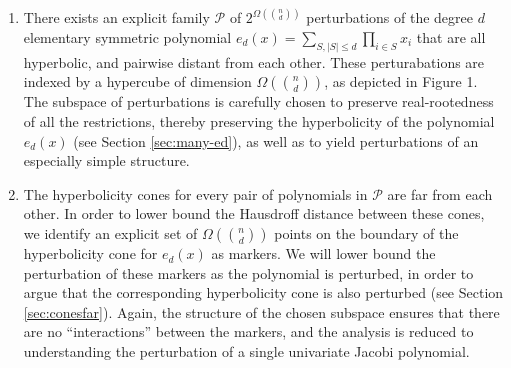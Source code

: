 \begin{enumerate}
\item There exists an explicit family $\mathcal{P}$ of $2^{\Omega(\binom{n}{d}
	)}$ perturbations of the degree $d$ elementary symmetric polynomial $e_d(x) = \sum_{S, |S| \leq d} \prod_{i \in S} x_i$ that are all hyperbolic, and pairwise distant from each other. These perturabations are indexed by a hypercube of dimension $\Omega(\binom{n}{d})$, as depicted in Figure 1.
%
The subspace of perturbations is carefully chosen to preserve real-rootedness
		of all the restrictions, thereby preserving the hyperbolicity
		of the polynomial $e_d(x)$ (see Section \ref{sec:many-ed}), as
		well as to yield perturbations of an especially simple
		structure.

\item The hyperbolicity cones for every pair of polynomials in $\mathcal{P}$ are far from each other.  In order to lower bound the Hausdroff distance between these cones, we identify an explicit set of $\Omega(\binom{n}{d})$ points on the boundary of the hyperbolicity cone for $e_d(x)$ as markers.  We will lower bound the perturbation of these markers as the polynomial is perturbed, in order to argue that the corresponding hyperbolicity cone is also perturbed (see Section \ref{sec:conesfar}). Again, the structure of the chosen subspace ensures that there are no ``interactions'' between the markers, and the analysis is reduced to understanding the perturbation of a single univariate Jacobi polynomial.
\end{enumerate}
